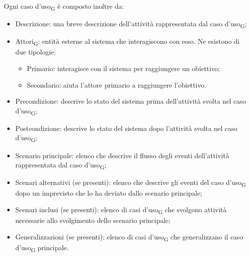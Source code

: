 	Ogni caso d'uso\textsubscript{G} è composto inoltre da:
	\begin{itemize}
		\item Descrizione: una breve descrizione dell'attività rappresentata dal caso d'uso\textsubscript{G};
		\item Attori\textsubscript{G}: entità esterne al sistema che interagiscono con esso. Ne esistono di due tipologie:
		\begin{itemize}
			\item Primario: interagisce con il sistema per raggiungere un obiettivo;
			\item Secondario: aiuta l'attore primario a raggiungere l'obiettivo.
		\end{itemize}
		\item Precondizione: descrive lo stato del sistema prima dell'attività svolta nel caso d'uso\textsubscript{G};
		\item Postcondizione: descrive lo stato del sistema dopo l'attività svolta nel caso d'uso\textsubscript{G};
		\item Scenario principale: elenco che descrive il flusso degli eventi dell'attività rappresentata dal caso d'uso\textsubscript{G};
		\item Scenari alternativi (se presenti): elenco che descrive gli eventi del caso d'uso\textsubscript{G} dopo un imprevisto che lo ha deviato dallo scenario principale;
		\item Scenari inclusi (se presenti): elenco di casi d'uso\textsubscript{G} che svolgono attività necessarie allo svolgimento dello scenario principale;
		\item Generalizzazioni (se presenti): elenco di casi d'uso\textsubscript{G} che generalizzano il caso d'uso\textsubscript{G} principale.
	\end{itemize}
    
